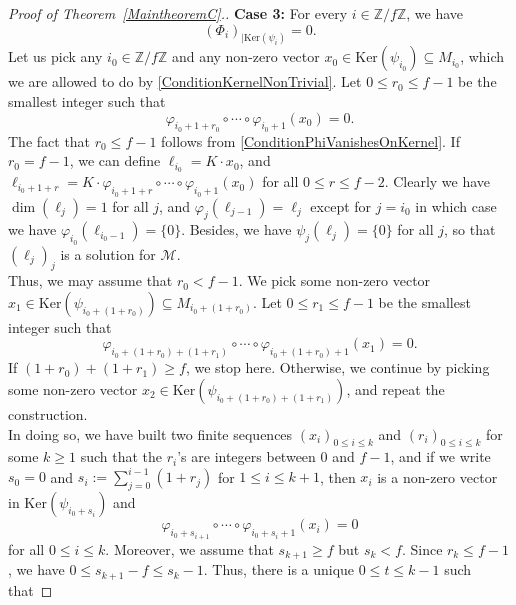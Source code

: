 \documentclass[12pt]{amsart}
\theoremstyle{definition}
\newcommand{\<}{\langle}   %
\renewcommand{\>}{\rangle} %
\begin{document}
\begin{proof}[Proof of Theorem~\ref{MaintheoremC}.]
    \textbf{Case 3:} For every $i \in \mathbb Z/f\mathbb Z$, we have 
    \begin{equation}\label{ConditionPhiVanishesOnKernel}
        (\Phi_i)_{|\mathrm{Ker}(\psi_i)} = 0.
    \end{equation}
    Let us pick any $i_0 \in \mathbb Z/f\mathbb Z$ and any non-zero vector $x_0 \in \mathrm{Ker}(\psi_{i_0}) \subseteq M_{i_0}$, which we are allowed to do by \eqref{ConditionKernelNonTrivial}. Let $0 \leq r_0 \leq f-1$ be the smallest integer such that 
    \begin{equation*}
        \varphi_{i_0+1+r_0} \circ \cdots \circ \varphi_{i_0+1}(x_0) = 0.
    \end{equation*}
    The fact that $r_0 \leq f-1$ follows from \eqref{ConditionPhiVanishesOnKernel}. If $r_0 = f-1$, we can define $\ell_{i_0} = K\cdot x_0$, and $\ell_{i_0+1+r} = K\cdot \varphi_{i_0+1+r} \circ \cdots \circ \varphi_{i_0+1}(x_0)$ for all $0 \leq r \leq f-2$. Clearly we have $\dim(\ell_j) = 1$ for all $j$, and $\varphi_{j}(\ell_{j-1}) = \ell_j$ except for $j = i_0$ in which case we have $\varphi_{i_0}(\ell_{i_0-1}) = \{0\}$. Besides, we have $\psi_j(\ell_j) = \{0\}$ for all $j$, so that $(\ell_j)_j$ is a solution for $\mathcal M$.\\
    Thus, we may assume that $r_0 < f-1$. We pick some non-zero vector $x_1 \in \mathrm{Ker}(\psi_{i_0+(1+r_0)}) \subseteq M_{i_0+(1+r_0)}$. Let $0 \leq r_1 \leq f-1$ be the smallest integer such that 
    \begin{equation*}
        \varphi_{i_0+(1+r_0)+(1+r_1)} \circ \cdots \circ \varphi_{i_0+(1+r_0)+1}(x_1) = 0.
    \end{equation*}
    If $(1+r_0)+(1+r_1) \geq f$, we stop here. Otherwise, we continue by picking some non-zero vector $x_2 \in \mathrm{Ker}(\psi_{i_0+(1+r_0)+(1+r_1)})$, and repeat the construction. \\
    In doing so, we have built two finite sequences $(x_i)_{0\leq i \leq k}$ and $(r_i)_{0 \leq i \leq k}$ for some $k\geq 1$ such that the $r_i$'s are integers between $0$ and $f-1$, and if we write $s_0 = 0$ and $s_i := \sum_{j=0}^{i-1}(1+r_j)$ for $1 \leq i \leq k+1$, then $x_i$ is a non-zero vector in $\mathrm{Ker}(\psi_{i_0+s_i})$ and 
    \begin{equation*}
        \varphi_{i_0+s_{i+1}}\circ \cdots \circ \varphi_{i_0+s_{i}+1}(x_{i}) = 0
    \end{equation*}
    for all $0 \leq i \leq k$. Moreover, we assume that $s_{k+1} \geq f$ but $s_{k} < f$. Since $r_{k} \leq f-1$, we have $0 \leq s_{k+1}-f \leq s_k-1$. Thus, there is a unique $0 \leq t \leq k-1$ such that 

\end{proof}
\end{document}
